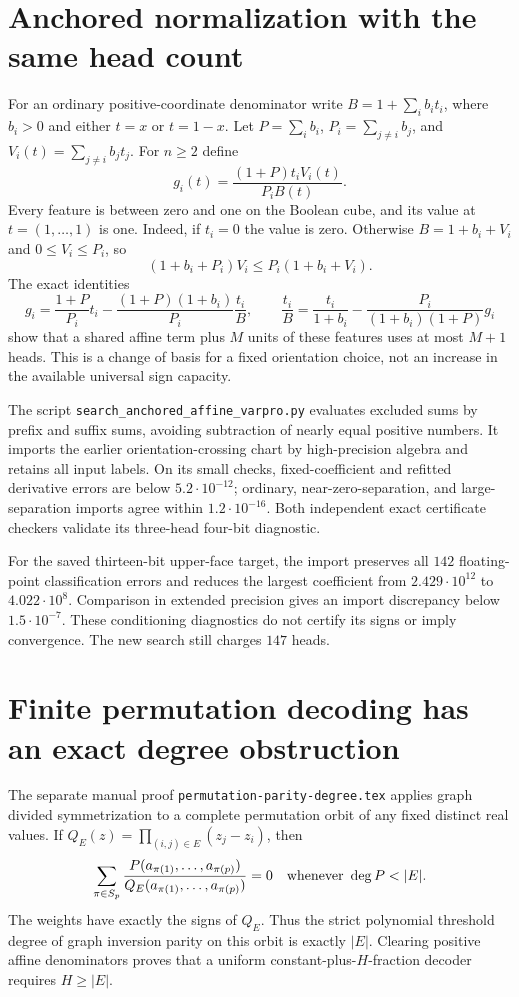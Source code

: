 \documentclass[11pt]{article}
\begin{document}
\section{Anchored normalization with the same head count}

For an ordinary positive-coordinate denominator write
$B=1+\sum_i b_it_i$, where $b_i>0$ and either $t=x$ or $t=1-x$.
Let $P=\sum_i b_i$, $P_i=\sum_{j\ne i}b_j$, and
$V_i(t)=\sum_{j\ne i}b_jt_j$. For $n\ge2$ define
\[
 g_i(t)=\frac{(1+P)t_iV_i(t)}{P_iB(t)}.
\]
Every feature is between zero and one on the Boolean cube, and its
value at $t=(1,\ldots,1)$ is one. Indeed, if $t_i=0$ the value is zero.
Otherwise $B=1+b_i+V_i$ and $0\le V_i\le P_i$, so
\[
 (1+b_i+P_i)V_i\le P_i(1+b_i+V_i).
\]
The exact identities
\[
 g_i=\frac{1+P}{P_i}t_i-
       \frac{(1+P)(1+b_i)}{P_i}\frac{t_i}{B},
 \qquad
 \frac{t_i}{B}=\frac{t_i}{1+b_i}
       -\frac{P_i}{(1+b_i)(1+P)}g_i
\]
show that a shared affine term plus $M$ units of these features uses
at most $M+1$ heads. This is a change of basis for a fixed orientation
choice, not an increase in the available universal sign capacity.

The script \texttt{search\_anchored\_affine\_varpro.py} evaluates excluded
sums by prefix and suffix sums, avoiding subtraction of nearly equal
positive numbers. It imports the earlier orientation-crossing chart by
high-precision algebra and retains all input labels. On its small
checks, fixed-coefficient and refitted derivative errors are below
$5.2\cdot10^{-12}$; ordinary, near-zero-separation, and large-separation
imports agree within $1.2\cdot10^{-16}$. Both independent exact
certificate checkers validate its three-head four-bit diagnostic.

For the saved thirteen-bit upper-face target, the import preserves
all $142$ floating-point classification errors and reduces the largest
coefficient from $2.429\cdot10^{12}$ to $4.022\cdot10^8$. Comparison
in extended precision gives an import discrepancy below
$1.5\cdot10^{-7}$. These conditioning diagnostics do not certify its
signs or imply convergence. The new search still charges $147$ heads.

\section{Finite permutation decoding has an exact degree obstruction}

The separate manual proof \texttt{permutation-parity-degree.tex}
applies graph divided symmetrization to a complete permutation orbit
of any fixed distinct real values. If
$Q_E(z)=\prod_{(i,j)\in E}(z_j-z_i)$, then
\[
 \sum_{\pi\in S_p}\frac{P(a_{\pi(1)},\ldots,a_{\pi(p)})}
 {Q_E(a_{\pi(1)},\ldots,a_{\pi(p)})}=0
 \quad\hbox{whenever }\deg P<|E|.
\]
The weights have exactly the signs of $Q_E$. Thus the strict polynomial
threshold degree of graph inversion parity on this orbit is exactly
$|E|$. Clearing positive affine denominators proves that a uniform
constant-plus-$H$-fraction decoder requires $H\ge|E|$.
\end{document}
